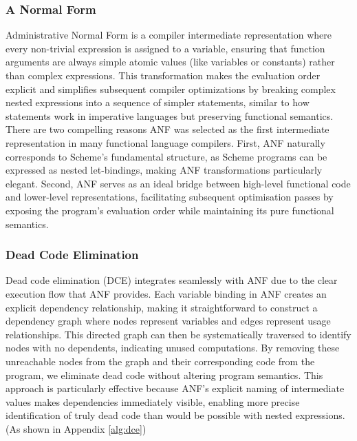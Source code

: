 \documentclass[final]{cmpreport_02}
\begin{document}
\subsubsection{A Normal Form}
Administrative Normal Form \cite{flanagan1993essence} is a compiler intermediate representation where every non-trivial expression is assigned to a variable, ensuring that function arguments are always simple atomic values (like variables or constants) rather than complex expressions. This transformation makes the evaluation order explicit and simplifies subsequent compiler optimizations by breaking complex nested expressions into a sequence of simpler statements, similar to how statements work in imperative languages but preserving functional semantics.
There are two compelling reasons ANF was selected as the first intermediate representation in many functional language compilers. First, ANF naturally corresponds to Scheme's fundamental structure, as Scheme programs can be expressed as nested let-bindings, making ANF transformations particularly elegant. Second, ANF serves as an ideal bridge between high-level functional code and lower-level representations, facilitating subsequent optimisation passes by exposing the program's evaluation order while maintaining its pure functional semantics.

\subsubsection{Dead Code Elimination}
Dead code elimination (DCE) integrates seamlessly with ANF due to the clear execution flow that ANF provides. Each variable binding in ANF creates an explicit dependency relationship, making it straightforward to construct a dependency graph where nodes represent variables and edges represent usage relationships. This directed graph can then be systematically traversed to identify nodes with no dependents, indicating unused computations. By removing these unreachable nodes from the graph and their corresponding code from the program, we eliminate dead code without altering program semantics. This approach is particularly effective because ANF's explicit naming of intermediate values makes dependencies immediately visible, enabling more precise identification of truly dead code than would be possible with nested expressions. 
(As shown in Appendix \ref{alg:dce})
\end{document}

